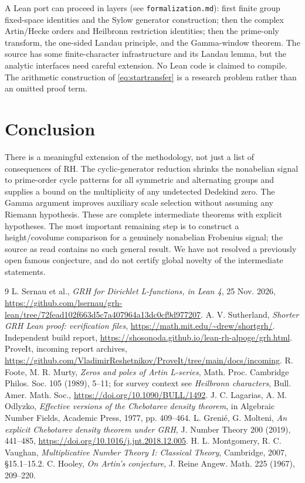 \documentclass[11pt]{article}
\theoremstyle{remark}\newtheorem{remark}[theorem]{Remark}
\begin{document}
A Lean port can proceed in layers (see \texttt{formalization.md}):
first finite group fixed-space identities and the Sylow generator
construction; then the complex Artin/Hecke orders and Heilbronn
restriction identities; then the prime-only transform, the
one-sided Landau principle, and the Gamma-window theorem. The source
has some finite-character infrastructure and its Landau lemma,
but the analytic interfaces need careful extension. No Lean code
is claimed to compile. The arithmetic construction of
\eqref{eq:startransfer} is a research problem rather than an omitted
proof term.

\section{Conclusion}
There is a meaningful extension of the methodology, not just a list
of consequences of RH. The cyclic-generator reduction shrinks the
nonabelian signal to prime-order cycle patterns for all symmetric
and alternating groups and supplies a bound on the multiplicity of
any undetected Dedekind zero. The Gamma argument improves auxiliary
scale selection without assuming any Riemann hypothesis. These are
complete intermediate theorems with explicit hypotheses. The most
important remaining step is to construct a height/covolume comparison
for a genuinely nonabelian Frobenius signal; the source as read
contains no such general result. We have not resolved a previously
open famous conjecture, and do not certify global novelty of the
intermediate statements.

\begin{thebibliography}{9}\small\setlength{\itemsep}{0pt}\setlength{\parsep}{0pt}
 L. Sernau et al., \emph{GRH for Dirichlet
L-functions, in Lean 4}, 25 Nov. 2026,
\url{https://github.com/lsernau/grh-lean/tree/72fead102f663d5c7a407964a13dc0cf9d977207}.
 A. V. Sutherland, \emph{Shorter GRH Lean proof:
verification files}, \url{https://math.mit.edu/~drew/shortgrh/}.
 Independent build report,
\url{https://shosonoda.github.io/lean-rh-alpoge/grh.html}.
 ProveIt, incoming report archives,
\url{https://github.com/VladimirReshetnikov/ProveIt/tree/main/docs/incoming}.
 R. Foote, M. R. Murty, \emph{Zeros and poles of
Artin L-series}, Math. Proc. Cambridge Philos. Soc. 105 (1989), 5--11;
for survey context see \emph{Heilbronn characters}, Bull. Amer. Math.
Soc., \url{https://doi.org/10.1090/BULL/1492}.
 J. C. Lagarias, A. M. Odlyzko, \emph{Effective versions
of the Chebotarev density theorem}, in Algebraic Number Fields,
Academic Press, 1977, pp. 409--464.
 L. Greni\'e, G. Molteni, \emph{An explicit Chebotarev
density theorem under GRH}, J. Number Theory 200 (2019), 441--485,
\url{https://doi.org/10.1016/j.jnt.2018.12.005}.
 H. L. Montgomery, R. C. Vaughan, \emph{Multiplicative
Number Theory I: Classical Theory}, Cambridge, 2007, \S15.1--15.2.
 C. Hooley, \emph{On Artin's conjecture}, J. Reine
Angew. Math. 225 (1967), 209--220.
\end{thebibliography}
\end{document}
